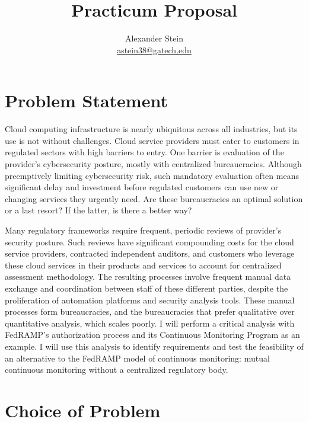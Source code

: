 \documentclass{jdf}
\begin{document}
\title{Practicum Proposal}
\author{Alexander Stein \\ \href{mailto:astein38@gatech.edu}{astein38@gatech.edu}}

\maketitle
\thispagestyle{fancy}

\section{Problem Statement}

Cloud computing infrastructure is nearly ubiquitous across all industries, but its use is not without challenges. Cloud service providers must cater to customers in regulated sectors with high barriers to entry. One barrier is evaluation of the provider's cybersecurity posture, mostly with centralized bureaucracies. Although preemptively limiting cybersecurity risk, such mandatory evaluation often means significant delay and investment before regulated customers can use new or changing services they urgently need. Are these bureaucracies an optimal solution or a last resort? If the latter, is there a better way?

Many regulatory frameworks require frequent, periodic reviews of provider's security posture. Such reviews have significant compounding costs for the cloud service providers, contracted independent auditors, and customers who leverage these cloud services in their products and services to account for centralized assessment methodology. The resulting processes involve frequent manual data exchange and coordination between staff of these different parties, despite the proliferation of automation platforms and security analysis tools. These manual processes form bureaucracies, and the bureaucracies that prefer qualitative over quantitative analysis, which scales poorly. I will perform a critical analysis with FedRAMP's authorization process and its Continuous Monitoring Program \citeyear[p.~18]{fedramp_auth_playbook} as an example. I will use this analysis to identify requirements and test the feasibility of an alternative to the FedRAMP model of continuous monitoring: mutual continuous monitoring without a centralized regulatory body.

\section{Choice of Problem}
\end{document}
